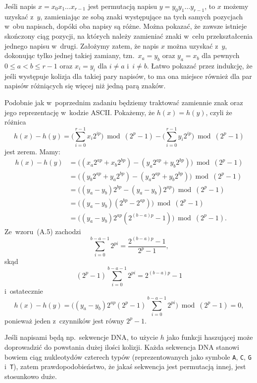 \exercise %
Jeśli napis $x=x_0x_1\dots x_{r-1}$ jest permutacją napisu $y=y_0y_1\dots y_{r-1}$, to $x$ możemy uzyskać z~$y$, zamieniając ze sobą znaki występujące na tych samych pozycjach w~obu napisach, dopóki oba napisy są różne.
Można pokazać, że zawsze istnieje skończony ciąg pozycji, na których należy zamieniać znaki w~celu przekształcenia jednego napisu w~drugi.
Założymy zatem, że napis $x$ można uzyskać z~$y$, dokonując tylko jednej takiej zamiany, tzn.\ $x_a=y_b$ oraz $y_a=x_b$ dla pewnych $0\le a<b\le r-1$ oraz $x_i=y_i$ dla $i\ne a$ i~$i\ne b$.
Łatwo pokazać przez indukcję, że jeśli występuje kolizja dla takiej pary napisów, to ma ona miejsce również dla par napisów różniących się więcej niż jedną parą znaków.

Podobnie jak w~poprzednim zadaniu będziemy traktować zamiennie znak oraz jego reprezentację w~kodzie ASCII\@.
Pokażemy, że $h(x)=h(y)$, czyli że różnica
\[
	h(x)-h(y) = \biggl(\sum_{i=0}^{r-1}x_i2^{ip}\biggr)\bmod(2^p-1)-\biggl(\sum_{i=0}^{r-1}y_i2^{ip}\biggr)\bmod(2^p-1)
\]
jest zerem.
Mamy:
\begin{align*}
	h(x)-h(y) &= \bigl((x_a2^{ap}+x_b2^{bp})-(y_a2^{ap}+y_b2^{bp})\bigr)\bmod(2^p-1) \\
	&= \bigl((y_b2^{ap}+y_a2^{bp})-(y_a2^{ap}+y_b2^{bp})\bigr)\bmod(2^p-1) \\
	&= \bigl((y_a-y_b)2^{bp}-(y_a-y_b)2^{ap}\bigr)\bmod(2^p-1) \\
	&= \bigl((y_a-y_b)(2^{bp}-2^{ap})\bigr)\bmod(2^p-1) \\
	&= \bigl((y_a-y_b)2^{ap}(2^{(b-a)p}-1)\bigr)\bmod(2^p-1).
\end{align*}
Ze~wzoru~(A.5) zachodzi
\[
	\sum_{i=0}^{b-a-1}2^{pi} = \frac{2^{(b-a)p}-1}{2^p-1},
\]
skąd
\[
	(2^p-1)\sum_{i=0}^{b-a-1}2^{pi} = 2^{(b-a)p}-1
\]
i~ostatecznie
\[
	h(x)-h(y) = \biggl((y_a-y_b)2^{ap}(2^p-1)\sum_{i=0}^{b-a-1}2^{pi}\biggr)\bmod(2^p-1) = 0,
\]
ponieważ jeden z~czynników jest równy $2^p-1$.

Jeśli napisami będą np.\ sekwencje DNA, to użycie $h$ jako funkcji haszującej może doprowadzić do powstania dużej ilości kolizji.
Każda sekwencja DNA stanowi bowiem ciąg nukleotydów czterech typów (reprezentowanych jako symbole \texttt{A}, \texttt{C}, \texttt{G} i~\texttt{T}), zatem prawdopodobieństwo, że jakaś sekwencja jest permutacją innej, jest stosunkowo duże.


